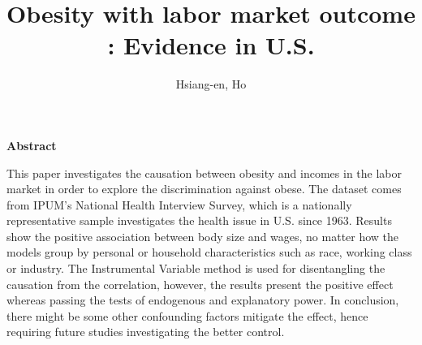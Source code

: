 \documentclass{article}
\title{Obesity with labor market outcome : Evidence in U.S.}
\author{Hsiang-en, Ho}
\date{}
\begin{document}
\maketitle
\noindent

\vspace{15pt}

\begin{center}
\large
\bf{Abstract}
\end{center}


This paper investigates the causation between obesity and incomes in the labor market in order to explore the discrimination against obese. The dataset comes from IPUM's National Health Interview Survey, which is a nationally representative sample investigates the health issue in U.S. since 1963. Results show the positive association between body size and wages, no matter how the models group by personal or household characteristics such as race, working class or industry. The Instrumental Variable method is used for disentangling the causation from the correlation, however, the results present the positive effect whereas passing the tests of endogenous and explanatory power. In conclusion, there might be some other confounding factors mitigate the effect, hence requiring future studies investigating the better control.


\vspace{45pt}
\end{document}
